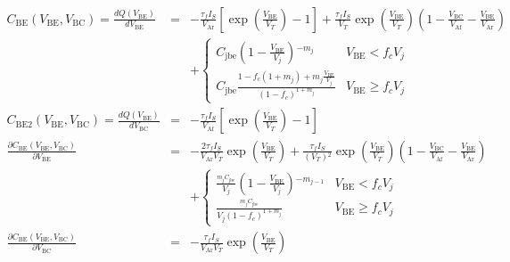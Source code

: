 \documentclass{article}
\begin{document}
\\
\begin{eqnarray*}
  C_{\text{BE}}\left(V_{\text{BE}},V_{\text{BC}}\right) = 
  \frac{dQ\left(V_{\text{BE}}\right)}{dV_{\text{BE}}} & = & 
  -\frac{\tau _fI_S}{V_{\text{Ar}}}
  \left[\exp \left(\frac{V_{\text{BE}}}{V_T}\right)-1\right]
  +\frac{\tau _fI_S}{V_T}\exp \left(\frac{V_{\text{BE}}}{V_T}\right)
  \left(1-\frac{V_{\text{BC}}}{V_{\text{Af}}}-\frac{V_{\text{BE}}}{V_{\text{Ar}}}\right)\\
  & & +\begin{cases}
 C_{\text{jbe}}\left(1-\frac{V_{\text{BE}}}{V_j}\right){}^{-m_j} & V_{\text{BE}}<f_cV_j \\
 C_{\text{jbe}}\frac{1-f_c\left(1+m_j\right)+m_j\frac{V_{\text{BE}}}{V_j}}
 {\left(1-f_c\right){}^{1+m_j}} & V_{\text{BE}}\geq f_cV_j
\end{cases}\\
C_{\text{BE2}}\left(V_{\text{BE}},V_{\text{BC}}\right) 
= \frac{dQ\left(V_{\text{BE}}\right)}{dV_{\text{BC}}} &= &
-\frac{\tau _fI_S}{V_{\text{Af}}}\left[\exp \left(\frac{V_{\text{BE}}}{V_T}\right)-1\right]\\
\frac{\partial C_{\text{BE}}\left(V_{\text{BE}},V_{\text{BC}}\right)}{\partial V_{\text{BE}}} & = &
-\frac{2\tau _fI_S}{V_{\text{Ar}}V_T}\exp \left(\frac{V_{\text{BE}}}{V_T}\right)
+ \frac{\tau _fI_S}{\left(V_T\right){}^2}\exp \left(\frac{V_{\text{BE}}}{V_T}\right)
\left(1-\frac{V_{\text{BC}}}{V_{\text{Af}}}-\frac{V_{\text{BE}}}{V_{\text{Ar}}}\right)\\
& & +\begin{cases}
 \frac{\text{}_{m_jC_{\text{jbe}}}}{V_j}\left(1-\frac{V_{\text{BE}}}{V_j}\right){}^{-m_{j-1}} & V_{\text{BE}}<f_cV_j \\
 \frac{\text{}_{m_jC_{\text{jbe}}}}{V_j\left(1-f_c\right){}^{1+m_j}} & V_{\text{BE}}\geq f_cV_j
\end{cases}\\
\frac{\partial C_{\text{BE}}\left(V_{\text{BE}},V_{\text{BC}}\right)}{\partial V_{\text{BC}}} & = &
-\frac{\tau _fI_S}{V_{\text{Ar}}V_T}\exp \left(\frac{V_{\text{BE}}}{V_T}\right)
\end{eqnarray*}
\end{document}
